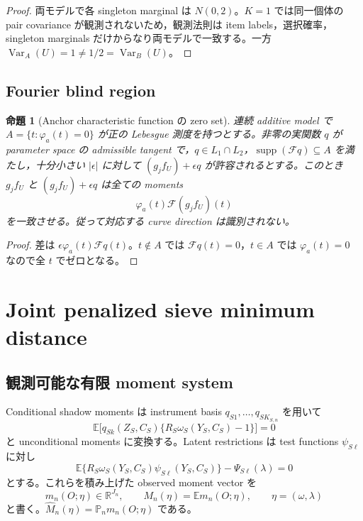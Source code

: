 \documentclass[11pt,a4paper]{ltjsarticle}
\newtheorem{proposition}{命題}[section]
\theoremstyle{remark}
\newcommand{\E}{\mathbb E}
\newcommand{\Pp}{\mathbb P}
\newcommand{\R}{\mathbb R}
\newcommand{\wh}{\widehat}
\newcommand{\Fop}{\mathscr F}
\newcommand{\Var}{\operatorname{Var}}
\newcommand{\supp}{\operatorname{supp}}
\begin{document}
\begin{proof}
両モデルで各 singleton marginal は $N(0,2)$。$K=1$ では同一個体の pair covariance が観測されないため，観測法則は item labels，選択確率，singleton marginals だけからなり両モデルで一致する。一方 $\Var_A(U)=1\neq1/2=\Var_B(U)$。
\end{proof}

\subsection{Fourier blind region}
\begin{proposition}[Anchor characteristic function の zero set]\label{prop:fourierblind}
連続 additive model で $A=\{t:\varphi_a(t)=0\}$ が正の Lebesgue 測度を持つとする。非零の実関数 $q$ が parameter space の admissible tangent で，$q\in L_1\cap L_2$，$\supp(\Fop q)\subseteq A$ を満たし，十分小さい $|\epsilon|$ に対して $(g_jf_U)+\epsilon q$ が許容されるとする。このとき $g_jf_U$ と $(g_jf_U)+\epsilon q$ は全ての moments
\[
\varphi_a(t)\Fop(g_jf_U)(t)
\]
を一致させる。従って対応する curve direction は識別されない。
\end{proposition}

\begin{proof}
差は $\epsilon\varphi_a(t)\Fop q(t)$。$t\notin A$ では $\Fop q(t)=0$，$t\in A$ では $\varphi_a(t)=0$ なので全 $t$ でゼロとなる。
\end{proof}

\section{Joint penalized sieve minimum distance}\label{sec:estimation}

\subsection{観測可能な有限 moment system}
Conditional shadow moments は instrument basis $q_{S1},\ldots,q_{SK_{S,n}}$ を用いて
\[
\E\bigl[q_{Sk}(Z_S,C_S)
\{R_S\omega_S(Y_S,C_S)-1\}\bigr]=0
\]
と unconditional moments に変換する。Latent restrictions は test functions $\psi_{S\ell}$ に対し
\[
\E\{R_S\omega_S(Y_S,C_S)\psi_{S\ell}(Y_S,C_S)\}
-\Psi_{S\ell}(\lambda)=0
\]
とする。これらを積み上げた observed moment vector を
\begin{equation}
m_n(O;\eta)\in\R^{J_n},
\qquad
M_n(\eta)=\E m_n(O;\eta),
\qquad \eta=(\omega,\lambda)
\label{eq:mn}
\end{equation}
と書く。$\wh M_n(\eta)=\Pp_n m_n(O;\eta)$ である。
\end{document}
